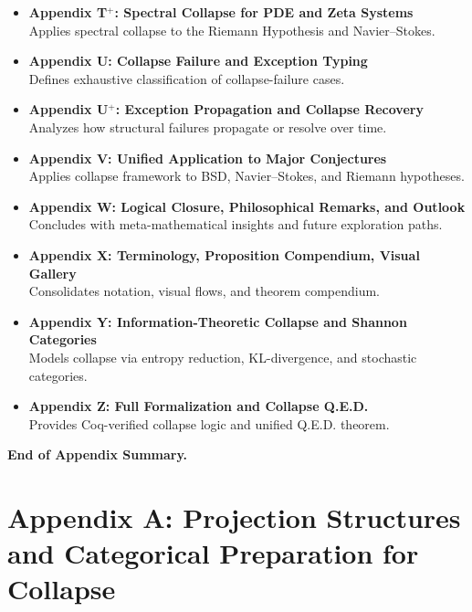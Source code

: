 \documentclass[11pt]{article}
\begin{document}
\begin{itemize}
  \item \textbf{Appendix T$^+$: Spectral Collapse for PDE and Zeta Systems} \\
  Applies spectral collapse to the Riemann Hypothesis and Navier–Stokes.

  \item \textbf{Appendix U: Collapse Failure and Exception Typing} \\
  Defines exhaustive classification of collapse-failure cases.

  \item \textbf{Appendix U$^+$: Exception Propagation and Collapse Recovery} \\
  Analyzes how structural failures propagate or resolve over time.

  \item \textbf{Appendix V: Unified Application to Major Conjectures} \\
  Applies collapse framework to BSD, Navier–Stokes, and Riemann hypotheses.

  \item \textbf{Appendix W: Logical Closure, Philosophical Remarks, and Outlook} \\
  Concludes with meta-mathematical insights and future exploration paths.

  \item \textbf{Appendix X: Terminology, Proposition Compendium, Visual Gallery} \\
  Consolidates notation, visual flows, and theorem compendium.

  \item \textbf{Appendix Y: Information-Theoretic Collapse and Shannon Categories} \\
  Models collapse via entropy reduction, KL-divergence, and stochastic categories.

  \item \textbf{Appendix Z: Full Formalization and Collapse Q.E.D.} \\
  Provides Coq-verified collapse logic and unified Q.E.D. theorem.

\end{itemize}

\vspace{1em}
\textbf{End of Appendix Summary.}



\appendix
\section*{Appendix A: Projection Structures and Categorical Preparation for Collapse}
\end{document}
